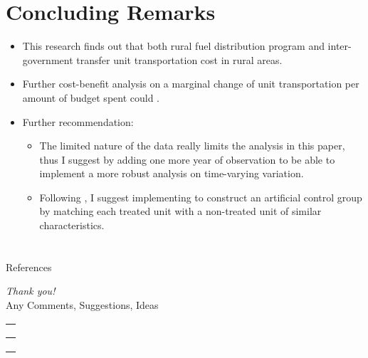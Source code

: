 \documentclass[
11pt,notheorems,compress,hyperref={pdfauthor=Maghfira Ramadhani}
]{beamer}
\begin{document}
\section{Concluding Remarks}
\begin{frame}
    \begin{itemize}
        \item This research finds out that both rural fuel distribution program and inter-government transfer  unit transportation cost in rural areas.
        \item Further cost-benefit analysis on a marginal change of unit transportation per amount of budget spent could .
        \item Further recommendation:
        \begin{itemize}
        \item The limited nature of the data really limits the analysis in this paper, thus I suggest  by adding one more year of observation to be able to implement a more robust analysis on time-varying variation.
        \item Following \citet{abadie2016}, I suggest implementing  to construct an artificial control group by matching each treated unit with a non-treated unit of similar characteristics.
        \end{itemize}
    \end{itemize}
\end{frame}

\section{}
\begin{frame}[allowframebreaks]{References}
    
    
\end{frame}

\begin{frame}{}
  \centering
  {\LARGE\emph{Thank you!}}\\
  \vspace{1cm}
  Any Comments, Suggestions, Ideas\\
  \href{mailto:\maghfira.ramadhani@gatech.edu}{\faEnvelope\ \  }\\
  \href{http://maghfiraer.github.io}{\faHome\ \  } \\
  \href{https://github.com/maghfiraer/ECON7023-Metrics-II/tree/main/Final_Project}{\faGithubSquare\ \  }
\end{frame}
\end{document}
